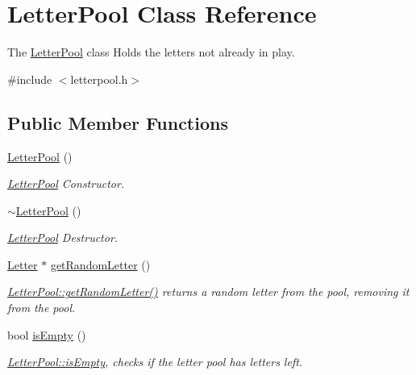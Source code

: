 \hypertarget{class_letter_pool}{\section{Letter\-Pool Class Reference}
\label{class_letter_pool}
}


The \hyperlink{class_letter_pool}{Letter\-Pool} class Holds the letters not already in play.  




{\ttfamily \#include $<$letterpool.\-h$>$}

\subsection*{Public Member Functions}
\begin{DoxyCompactItemize}
\item 
\hyperlink{class_letter_pool_a23cf1ae898b12849f662851da3ea2b87}{Letter\-Pool} ()
\begin{DoxyCompactList}\small\item\em \hyperlink{class_letter_pool}{Letter\-Pool} Constructor. \end{DoxyCompactList}\item 
\hyperlink{class_letter_pool_a5299eb1a1857df503273ad34f8667a05}{$\sim$\-Letter\-Pool} ()
\begin{DoxyCompactList}\small\item\em \hyperlink{class_letter_pool}{Letter\-Pool} Destructor. \end{DoxyCompactList}\item 
\hyperlink{class_letter}{Letter} $\ast$ \hyperlink{class_letter_pool_acf36848e6c23f40de9b98f43755d586c}{get\-Random\-Letter} ()
\begin{DoxyCompactList}\small\item\em \hyperlink{class_letter_pool_acf36848e6c23f40de9b98f43755d586c}{Letter\-Pool\-::get\-Random\-Letter()} returns a random letter from the pool, removing it from the pool. \end{DoxyCompactList}\item 
bool \hyperlink{class_letter_pool_a47817d0343b330f2c6f3413288de69b2}{is\-Empty} ()
\begin{DoxyCompactList}\small\item\em \hyperlink{class_letter_pool_a47817d0343b330f2c6f3413288de69b2}{Letter\-Pool\-::is\-Empty}, checks if the letter pool has letters left. \end{DoxyCompactList}\end{DoxyCompactItemize}
